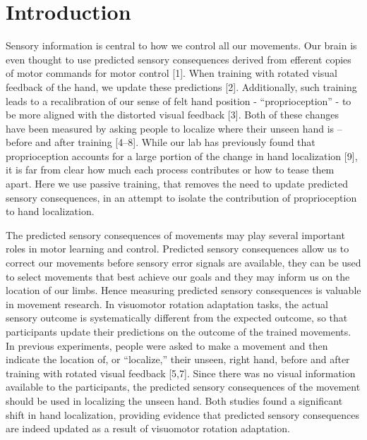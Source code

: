 \documentclass[10pt,letterpaper]{article}
\begin{document}

\linenumbers

\section{Introduction}\label{introduction}

Sensory information is central to how we control all our movements. Our
brain is even thought to use predicted sensory consequences derived from
efferent copies of motor commands for motor control {[}1{]}. When
training with rotated visual feedback of the hand, we update these
predictions {[}2{]}. Additionally, such training leads to a
recalibration of our sense of felt hand position - ``proprioception'' -
to be more aligned with the distorted visual feedback {[}3{]}. Both of
these changes have been measured by asking people to localize where
their unseen hand is -- before and after training {[}4--8{]}. While our
lab has previously found that proprioception accounts for a large
portion of the change in hand localization {[}9{]}, it is far from clear
how much each process contributes or how to tease them apart. Here we
use passive training, that removes the need to update predicted sensory
consequences, in an attempt to isolate the contribution of
proprioception to hand localization.

The predicted sensory consequences of movements may play several
important roles in motor learning and control. Predicted sensory
consequences allow us to correct our movements before sensory error
signals are available, they can be used to select movements that best
achieve our goals and they may inform us on the location of our limbs.
Hence measuring predicted sensory consequences is valuable in movement
research. In visuomotor rotation adaptation tasks, the actual sensory
outcome is systematically different from the expected outcome, so that
participants update their predictions on the outcome of the trained
movements. In previous experiments, people were asked to make a movement
and then indicate the location of, or ``localize,'' their unseen, right
hand, before and after training with rotated visual feedback {[}5,7{]}.
Since there was no visual information available to the participants, the
predicted sensory consequences of the movement should be used in
localizing the unseen hand. Both studies found a significant shift in
hand localization, providing evidence that predicted sensory
consequences are indeed updated as a result of visuomotor rotation
adaptation.
\end{document}
